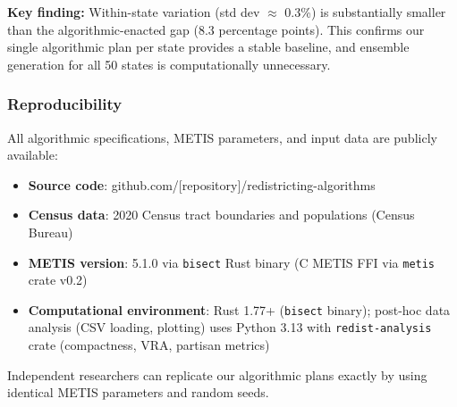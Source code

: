 \textbf{Key finding:} Within-state variation (std dev $\approx$ 0.3\%) is substantially smaller than the algorithmic-enacted gap (8.3 percentage points). This confirms our single algorithmic plan per state provides a stable baseline, and ensemble generation for all 50 states is computationally unnecessary.

\subsubsection{Reproducibility}

All algorithmic specifications, METIS parameters, and input data are publicly available:
\begin{itemize}
    \item \textbf{Source code}: github.com/[repository]/redistricting-algorithms
    \item \textbf{Census data}: 2020 Census tract boundaries and populations (Census Bureau)
    \item \textbf{METIS version}: 5.1.0 via \texttt{bisect} Rust binary (C METIS FFI via \texttt{metis} crate v0.2)
    \item \textbf{Computational environment}: Rust 1.77+ (\texttt{bisect} binary); post-hoc data analysis (CSV loading, plotting) uses Python 3.13 with \texttt{redist-analysis} crate (compactness, VRA, partisan metrics)
\end{itemize}

Independent researchers can replicate our algorithmic plans exactly by using identical METIS parameters and random seeds.
